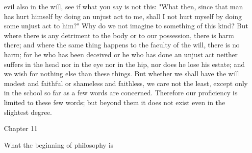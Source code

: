 \documentclass[a4paper]{article}
\begin{document}
evil also in the will, see if what you say is not this: "What then, since that
man has hurt himself by doing an unjust act to me, shall I not hurt myself by
doing some unjust act to him?" Why do we not imagine to something of this kind?
But where there is any detriment to the body or to our possession, there is
harm there; and where the same thing happens to the faculty of the will, there
is no harm; for he who has been deceived or he who has done an unjust act
neither suffers in the head nor in the eye nor in the hip, nor does he lose his
estate; and we wish for nothing else than these things. But whether we shall
have the will modest and faithful or shameless and faithless, we care not the
least, except only in the school so far as a few words are concerned. Therefore
our proficiency is limited to these few words; but beyond them it does not
exist even in the slightest degree.

Chapter 11

What the beginning of philosophy is
\end{document}
